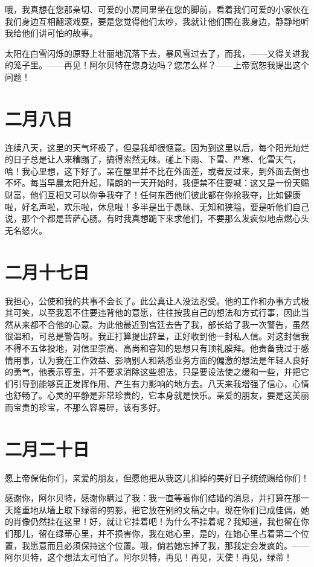 \documentclass[12pt,oneside]{book}
\begin{document}
哦，我真想在您那亲切、可爱的小房间里坐在您的脚前，看着我们可爱的小家伙在我们身边互相翻滚戏耍，要是您觉得他们太吵，我就让他们围在我身边，静静地听我给他们讲可怕的故事。

太阳在白雪闪烁的原野上壮丽地沉落下去，暴风雪过去了，而我，——又得关进我的笼子里。——再见！阿尔贝特在您身边吗？您怎么样？——上帝宽恕我提出这个问题！
　　

\chapter{二月八日}
\label{sec-3-6}
连续八天，这里的天气坏极了，但是我却很惬意。因为到这里以后，每个阳光灿烂的日子总是让人来糟蹋了，搞得索然无味。碰上下雨、下雪、严寒、化雪天气，哈！我心里想，这下好了。呆在屋里并不比在外面差，或者反过来，到外面去倒也不坏。每当早晨太阳升起，晴朗的一天开始时，我便禁不住要喊：这又是一份天赐财富，他们互相又可以你争我夺了！任何东西他们彼此都在你抢我夺，比如健康啦，好名声啦，欢乐啦，休息啦！多半是出于愚昧、无知和狭隘，要是听他们自己说，那个个都是菩萨心肠。有时我真想跪下来求他们，不要那么发疯似地点燃心头无名怒火。
　　

\chapter{二月十七日}
\label{sec-3-7}
我担心，公使和我的共事不会长了。此公真让人没法忍受。他的工作和办事方式极其可笑，以至我忍不住要违背他的意愿，往往按我自己的想法和方式行事，因此当然从来都不合他的心意。为此他最近到宫廷去告了我，部长给了我一次警告，虽然很温和，可总是警告呀。我正打算提出辞呈，正好收到他一封私人信。对这封信我不得不五体投地，对信里崇高、高尚和睿知的思想只有顶礼膜拜。他责备我过于感情用事，认为我在工作效益、影响别人和熟悉业务方面的偏激的想法是年轻人良好的勇气，他表示尊重，并不要求消除这些想法，只是要设法使之缓和一些，并把它们引导到能够真正发挥作用、产生有力影响的地方去。八天来我增强了信心，心情也舒畅了。心灵的平静是非常珍贵的，它本身就是快乐。亲爱的朋友，要是这美丽而宝贵的珍宝，不那么容易碎，该有多好。
　　

\chapter{二月二十日}
\label{sec-3-8}
愿上帝保佑你们，亲爱的朋友，但愿他把从我这儿扣掉的美好日子统统赐给你们！

感谢你，阿尔贝特，感谢你瞒过了我：我一直等着你们结婚的消息，并打算在那一天隆重地从墙上取下绿蒂的剪影，把它放在别的文稿之中。现在你们已成佳偶，她的肖像仍然挂在这里！好，就让它挂着吧！为什么不挂着呢？我知道，我也留在你们那儿，留在绿蒂心里，并不损害你，我在她心里，是的，在她心里占着第二个位置，我愿意而且必须保持这个位置。哦，倘若她忘掉了我，那我定会发疯的。——阿尔贝特，这个想法太可怕了。阿尔贝特，再见！再见，天使！再见，绿蒂！
　　
\end{document}
